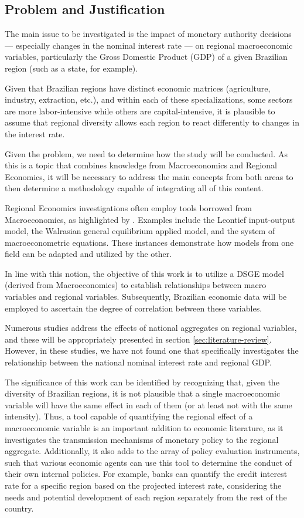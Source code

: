 \documentclass[
thesis.tex
]{subfiles}
\begin{document}
	\subsection*{Problem and Justification}
	
	The main issue to be investigated is the impact of monetary authority decisions --- especially changes in the nominal interest rate --- on regional macroeconomic variables, particularly the Gross Domestic Product (GDP) of a given Brazilian region (such as a state, for example).
	
	Given that Brazilian regions have distinct economic matrices (agriculture, industry, extraction, etc.), and within each of these specializations, some sectors are more labor-intensive while others are capital-intensive, it is plausible to assume that regional diversity allows each region to react differently to changes in the interest rate.
	
	Given the problem, we need to determine how the study will be conducted. As this is a topic that combines knowledge from Macroeconomics and Regional Economics, it will be necessary to address the main concepts from both areas to then determine a methodology capable of integrating all of this content.
	
	Regional Economics investigations often employ tools borrowed from Macroeconomics, as highlighted by \textcite{rickman_modern_2010}. Examples include the Leontief input-output model, the Walrasian general equilibrium applied model, and the system of macroeconometric equations. These instances demonstrate how models from one field can be adapted and utilized by the other.
	
	In line with this notion, the objective of this work is to utilize a DSGE model (derived from Macroeconomics) to establish relationships between macro variables and regional variables. Subsequently, Brazilian economic data will be employed to ascertain the degree of correlation between these variables.
	
	Numerous studies address the effects of national aggregates on regional variables, and these will be appropriately presented in section \ref{sec:literature-review}. However, in these studies, we have not found one that specifically investigates the relationship between the national nominal interest rate and regional GDP.
	
	The significance of this work can be identified by recognizing that, given the diversity of Brazilian regions, it is not plausible that a single macroeconomic variable will have the same effect in each of them (or at least not with the same intensity). Thus, a tool capable of quantifying the regional effect of a macroeconomic variable is an important addition to economic literature, as it investigates the transmission mechanisms of monetary policy to the regional aggregate. Additionally, it also adds to the array of policy evaluation instruments, such that various economic agents can use this tool to determine the conduct of their own internal policies. For example, banks can quantify the credit interest rate for a specific region based on the projected interest rate, considering the needs and potential development of each region separately from the rest of the country.
	
\end{document}
